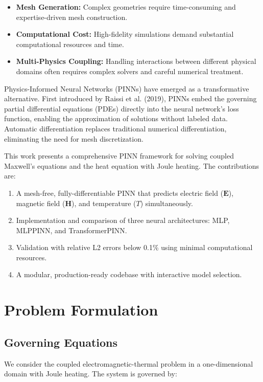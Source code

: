 \documentclass[11pt,a4paper]{article}
\begin{document}
\begin{itemize}
    \item \textbf{Mesh Generation:} Complex geometries require time-consuming and expertise-driven mesh construction.
    \item \textbf{Computational Cost:} High-fidelity simulations demand substantial computational resources and time.
    \item \textbf{Multi-Physics Coupling:} Handling interactions between different physical domains often requires complex solvers and careful numerical treatment.
\end{itemize}

Physics-Informed Neural Networks (PINNs) have emerged as a transformative alternative. First introduced by Raissi et al. (2019), PINNs embed the governing partial differential equations (PDEs) directly into the neural network's loss function, enabling the approximation of solutions without labeled data. Automatic differentiation replaces traditional numerical differentiation, eliminating the need for mesh discretization.

This work presents a comprehensive PINN framework for solving coupled Maxwell's equations and the heat equation with Joule heating. The contributions are:

\begin{enumerate}
    \item A mesh-free, fully-differentiable PINN that predicts electric field ($\mathbf{E}$), magnetic field ($\mathbf{H}$), and temperature ($T$) simultaneously.
    \item Implementation and comparison of three neural architectures: MLP, MLPPINN, and TransformerPINN.
    \item Validation with relative L2 errors below 0.1\% using minimal computational resources.
    \item A modular, production-ready codebase with interactive model selection.
\end{enumerate}

\section{Problem Formulation}

\subsection{Governing Equations}

We consider the coupled electromagnetic-thermal problem in a one-dimensional domain with Joule heating. The system is governed by:
\end{document}
